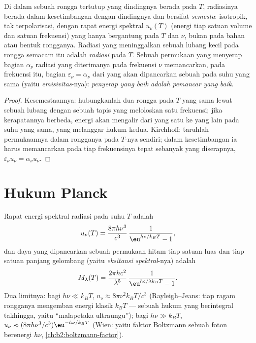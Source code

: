 \begin{proposition}\label{prop:b2:thermal-radiation:kirchhoff}
Di dalam sebuah rongga tertutup yang dindingnya berada pada $T$, radiasinya berada dalam
kesetimbangan dengan dindingnya dan bersifat \emph{semesta}: isotropik,
tak terpolarisasi, dengan rapat energi spektral $u_\nu(T)$ (energi tiap satuan
volume dan satuan frekuensi) yang hanya bergantung pada $T$ dan $\nu$, bukan pada
bahan atau bentuk rongganya. Radiasi yang meninggalkan sebuah lubang kecil pada
rongga semacam itu adalah \emph{radiasi } pada $T$. Sebuah permukaan yang
menyerap bagian $\alpha_\nu$ radiasi yang diterimanya pada
frekuensi $\nu$ memancarkan, pada frekuensi itu, bagian
$\varepsilon_\nu = \alpha_\nu$ dari yang akan dipancarkan sebuah  pada suhu
yang sama (yaitu \emph{emisivitas}-nya):
\emph{penyerap yang baik adalah pemancar yang baik}.
\end{proposition}

\begin{proof}
Kesemestaannya: hubungkanlah dua rongga pada $T$ yang sama lewat sebuah lubang dengan sebuah
tapis yang meloloskan satu frekuensi; jika kerapatannya berbeda, energi akan
mengalir dari yang satu ke yang lain pada suhu yang sama, yang melanggar hukum
kedua. Kirchhoff: taruhlah permukaannya dalam rongganya pada $T$-nya sendiri; dalam
kesetimbangan ia harus memancarkan pada tiap frekuensinya tepat sebanyak yang diserapnya,
$\varepsilon_\nu u_\nu = \alpha_\nu u_\nu$.
\end{proof}

\section{Hukum Planck}

\begin{theorem}\label{thm:b2:thermal-radiation:planck}
Rapat energi spektral radiasi  pada suhu
$T$ adalah
\[
u_\nu(T) = \frac{8\pi h\nu^3}{c^3}\,\frac{1}{\eu^{h\nu/k_BT} - 1},
\]
dan daya yang dipancarkan sebuah permukaan hitam tiap satuan luas dan tiap satuan
panjang gelombang (yaitu \emph{eksitansi spektral}-nya) adalah
\[
M_\lambda(T) = \frac{2\pi hc^2}{\lambda^5}\,\frac{1}{\eu^{hc/\lambda k_BT} - 1}.
\]
Dua limitnya: bagi $h\nu \ll k_BT$, $u_\nu \approx 8\pi\nu^2 k_BT/c^3$
(Rayleigh--Jeans: tiap ragam rongganya mengemban energi klasik
$k_BT$ --- sebuah hukum yang berintegral takhingga, yaitu ``malapetaka
ultraungu''); bagi $h\nu \gg k_BT$, $u_\nu \approx (8\pi h\nu^3/c^3)
\eu^{-h\nu/k_BT}$ (Wien: yaitu faktor Boltzmann sebuah foton berenergi
$h\nu$, \cref{ch:b2:boltzmann-factor}).
\end{theorem}

